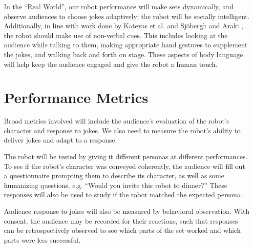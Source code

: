 \documentclass[onecolumn, draftclsnofoot,10pt, compsoc]{IEEEtran}
\begin{document}
In the “Real World”, our robot performance will make sets dynamically, and observe audiences to choose jokes adaptively; the robot will be socially intelligent. Additionally, in line with work done by Katevas et al. {\cite{RobotComedyLab:2015}} and Sjöbergh and Araki {\cite{RobotsMakeThings:2008}}, the robot should make use of non-verbal cues. This includes looking at the audience while talking to them, making appropriate hand gestures to supplement the jokes, and walking back and forth on stage. These aspects of body language will help keep the audience engaged and give the robot a human touch.


\section{Performance Metrics}

Broad metrics involved will include the audience’s evaluation of the robot’s character and response to jokes. We also need to measure the robot’s ability to deliver jokes and adapt to a response.

The robot will be tested by giving it different personas at different performances. To see if the robot’s character was conveyed coherently, the audience will fill out a questionnaire prompting them to describe its character, as well as some humanizing questions, e.g. “Would you invite this robot to dinner?” These responses will also be used to study if the robot matched the expected persona.

Audience response to jokes will also be measured by behavioral observation. With consent, the audience may be recorded for their reactions, such that responses can be retrospectively observed to see which parts of the set worked and which parts were less successful.




\end{document}
